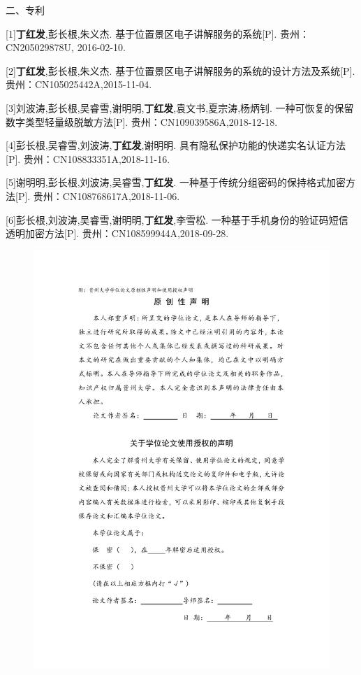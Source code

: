 \documentclass[pdftex,notypeinfo,twoside,openany,UTF8,fntef]{CASthesis}
\theoremstyle{THrm}{
	\newtheorem{question}{Question}[section]
	\newtheorem{property}{性质}[section]
	\newtheorem{assumption}{假设}[section]
	\newtheorem{claim}[lemma]{断言}
	
}
\begin{document}
\begin{resumelist}{二、专利}

[1]\textbf{丁红发},彭长根,朱义杰. 基于位置景区电子讲解服务的系统[P]. 贵州：CN205029878U, 2016-02-10.

[2]\textbf{丁红发},彭长根,朱义杰. 基于位置景区电子讲解服务的系统的设计方法及系统[P]. 贵州：CN105025442A,2015-11-04.

[3]刘波涛,彭长根,吴睿雪,谢明明,\textbf{丁红发},袁文书,夏宗涛,杨炳钊. 一种可恢复的保留数字类型轻量级脱敏方法[P]. 贵州：CN109039586A,2018-12-18.

[4]彭长根,吴睿雪,刘波涛,\textbf{丁红发},谢明明. 具有隐私保护功能的快递实名认证方法[P]. 贵州：CN108833351A,2018-11-16.

[5]谢明明,彭长根,刘波涛,吴睿雪,\textbf{丁红发}. 一种基于传统分组密码的保持格式加密方法[P]. 贵州：CN108768617A,2018-11-06.

[6]彭长根,刘波涛,吴睿雪,谢明明,\textbf{丁红发},李雪松. 一种基于手机身份的验证码短信透明加密方法[P]. 贵州：CN108599944A,2018-09-28.


\end{resumelist}


 \pagestyle{empty}
\begin{center}
\begin{figure}
  \centering
  \includegraphics[width=\textwidth]{shengming.pdf}
\end{figure}
\end{center}
\end{document}
